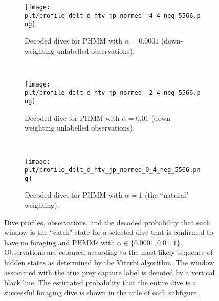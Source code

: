 \begin{figure}
    \centering
    \begin{subfigure}[t]{0.45\textwidth}
        \centering
        \texttt{[image: plt/profile\_delt\_d\_htv\_jp\_normed\_-4\_4\_neg\_5566.png]}
        \caption{Decoded dives for PHMM with $\alpha = 0.0001$ (down-weighting unlabelled observations).}
    \end{subfigure}
    ~
    \begin{subfigure}[t]{0.45\textwidth}
        \centering
        \texttt{[image: plt/profile\_delt\_d\_htv\_jp\_normed\_-2\_4\_neg\_5566.png]}
        \caption{Decoded dive for PHMM with $\alpha = 0.01$ (down-weighting unlabelled observations).}
    \end{subfigure}
    \\
    \begin{subfigure}[t]{0.45\textwidth}
        \centering
        \texttt{[image: plt/profile\_delt\_d\_htv\_jp\_normed\_0\_4\_neg\_5566.png]}
        \caption{Decoded dives for PHMM with $\alpha = 1$ (the ``natural" weighting).}
    \end{subfigure}
    \caption{Dive profiles, observations, and the decoded probability that each window is the ``catch" state for a selected dive that is confirmed to have no foraging and PHMMs with $\alpha \in \{0.0001,0.01,1\}$. Observations are coloured according to the most-likely sequence of hidden states as determined by the Viterbi algorithm. The window associated with the true prey capture label is denoted by a vertical black line. The estimated probability that the entire dive is a successful foraging dive is shown in the title of each subfigure.}
    \label{fig:profiles_5566}
\end{figure}



